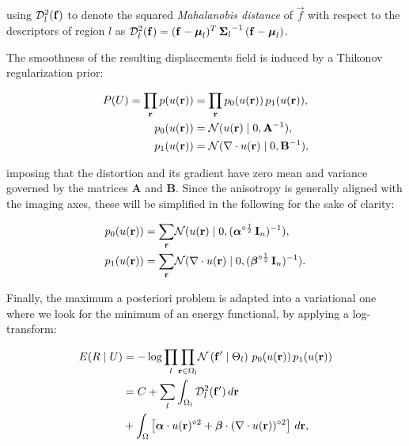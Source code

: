  using $\mdist{f}{l}$ to denote the squared \emph{Mahalanobis distance} of $\vec{f}$ with respect
  to the descriptors of region $l$ as
  $\mdist{f}{l} = (\vec{f} - \boldsymbol{\mu}_l)^T \, {\boldsymbol{\Sigma}_l}^{-1} \, (\vec{f} - \boldsymbol{\mu}_l)$.


The smoothness of the resulting displacements field is induced by a Thikonov regularization
  prior:

  \begin{align*}
  P(U) = \underset{\vec{r}}{\prod}\, p(u(\vec{r})) &=
  \underset{\vec{r}}{\prod}\, p_0(u(\vec{r})) \, p_1(u(\vec{r})), \\
  p_0(u(\vec{r})) &= \mathcal{N}( u(\vec{r}) \mid 0, \mathbf{A}^{-1}), \notag\\
  p_1(u(\vec{r})) &= \mathcal{N}(  \nabla \cdot u(\vec{r}) \mid 0, \mathbf{B}^{-1}),
  \end{align*}

  imposing that the distortion and its gradient have zero
  mean and variance governed by the matrices $\mathbf{A}$ and $\mathbf{B}$.
Since the anisotropy is generally aligned with the imaging axes, these will be simplified
  in the following for the sake of clarity:

  \begin{align}
    p_0(u(\vec{r})) &= \underset{\vec{r}}{\sum} \mathcal{N}( u(\vec{r}) \mid 0,
      (\boldsymbol{\alpha}^{\circ\frac12}\,\vec{I}_n)^{-1}), \notag\\
    p_1(u(\vec{r})) &= \underset{\vec{r}}{\sum} \mathcal{N}( \nabla \cdot u(\vec{r}) \mid 0,
      (\boldsymbol{\beta}^{\circ\frac12}\,\vec{I}_n)^{-1}).
  \label{eq:priors}
  \end{align}


Finally, the maximum a posteriori problem is adapted into a variational one where we look for
  the minimum of an energy functional, by applying a log-transform:

  \begin{align}
  E(R \mid U) &= -\log \underset{l}{\prod}
  \underset{\vec{r} \in \Omega_l}{\prod}
  \mathcal{N} \left( \vec{f}' \mid \Theta_l \right)\,p_0( u(\vec{r}))\,p_1( u(\vec{r})) \notag\\
  &= C + \underset{l}{\sum} \int_{\Omega_l}
  \mdist{f'}{l} \,d\vec{r} \notag\\
  &+ \int_{\Omega} \left[ \boldsymbol{\alpha} \cdot u(\vec{r})^{\circ2}
  + \boldsymbol{\beta} \cdot (\nabla \cdot u(\vec{r}))^{\circ2} \right] \,d\vec{r},
  \label{eq:energy}
  \end{align}

